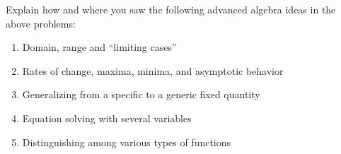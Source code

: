 \begin{prob}
Explain how and where you saw the following advanced algebra ideas in the above problems:  
\begin{enumerate}
\item Domain, range and ``limiting cases''
\item Rates of change, maxima, minima, and asymptotic behavior
\item Generalizing from a specific to a generic fixed quantity
\item Equation solving with several variables
\item Distinguishing among various types of functions
\end{enumerate}
\end{prob}
